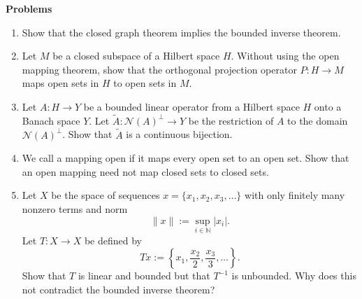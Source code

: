 \textbf{Problems}

\begin{enumerate}[label=\thesection.\arabic*.,ref=\thesection.\arabic*,start=12,series=book-problems]

\item\label{ex:closed-graph-implies-bounded-inverse} Show that the closed graph theorem implies the bounded inverse theorem.

\item\label{ex:orthogonal-projection-open-map} Let $M$ be a closed subspace of a Hilbert space $H$. Without using the open mapping theorem, show that the orthogonal projection operator $P:H\to M$ maps open sets in $H$ to open sets in $M$.

\item\label{ex:surjective-hilbert-operator-null-complement-bijection} Let $A:H\to Y$ be a bounded linear operator from a Hilbert space $H$ onto a Banach space $Y$. Let $\widetilde A:\mathcal{N}(A)^\perp\to Y$ be the restriction of $A$ to the domain $\mathcal{N}(A)^\perp$. Show that $\widetilde A$ is a continuous bijection.

\item\label{ex:open-map-need-not-preserve-closed-sets} We call a mapping open if it maps every open set to an open set. Show that an open mapping need not map closed sets to closed sets.

\item\label{ex:incomplete-finite-sequence-bounded-inverse-counterexample} Let $X$ be the space of sequences $x=\{x_1,x_2,x_3,\ldots\}$ with only finitely many nonzero terms and norm\[\|x\|:=\sup_{i\in\mathbb{N}}|x_i|.\]Let $T:X\to X$ be defined by\[Tx:=\left\{x_1,\dfrac{x_2}{2},\dfrac{x_3}{3},\ldots\right\}.\]Show that $T$ is linear and bounded but that $T^{-1}$ is unbounded. Why does this not contradict the bounded inverse theorem?

\end{enumerate}
